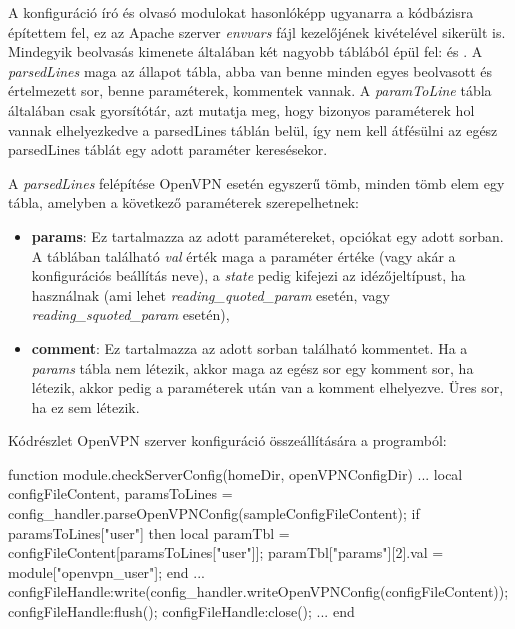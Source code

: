 A konfiguráció író és olvasó modulokat hasonlóképp ugyanarra a kódbázisra építettem fel, ez az Apache szerver \textit{envvars} fájl kezelőjének kivételével sikerült is. Mindegyik beolvasás kimenete általában két nagyobb táblából épül fel: \textit{} és \textit{}.
A \textit{parsedLines} maga az állapot tábla, abba van benne minden egyes beolvasott és értelmezett sor, benne paraméterek, kommentek vannak. A \textit{paramToLine} tábla általában csak gyorsítótár, azt mutatja meg, hogy bizonyos paraméterek hol vannak elhelyezkedve a parsedLines táblán belül, így nem kell átfésülni az egész parsedLines táblát egy adott paraméter keresésekor.

A \textit{parsedLines} felépítése OpenVPN esetén egyszerű tömb, minden tömb elem egy tábla, amelyben a következő paraméterek szerepelhetnek:

\begin{itemize}
    \item \textbf{params}: Ez tartalmazza az adott paramétereket, opciókat egy adott sorban. A táblában található \textit{val} érték maga a paraméter értéke (vagy akár a konfigurációs beállítás neve), a \textit{state} pedig kifejezi az idézőjeltípust, ha használnak (ami lehet \textit{reading\_quoted\_param}  esetén, vagy \textit{reading\_squoted\_param}  esetén),
    \item \textbf{comment}: Ez tartalmazza az adott sorban található kommentet. Ha a \textit{params} tábla nem létezik, akkor maga az egész sor egy komment sor, ha létezik, akkor pedig a paraméterek után van a komment elhelyezve. Üres sor, ha ez sem létezik.
\end{itemize}

Kódrészlet OpenVPN szerver konfiguráció összeállítására a programból:

\begin{lua}
function module.checkServerConfig(homeDir, openVPNConfigDir)
...
  local configFileContent, paramsToLines = config_handler.parseOpenVPNConfig(sampleConfigFileContent);
  if paramsToLines["user"] then
    local paramTbl = configFileContent[paramsToLines["user"]];
    paramTbl["params"][2].val = module["openvpn_user"];
  end
...
  configFileHandle:write(config_handler.writeOpenVPNConfig(configFileContent));
  configFileHandle:flush();
  configFileHandle:close();
...
end
\end{lua}
\pagebreak

